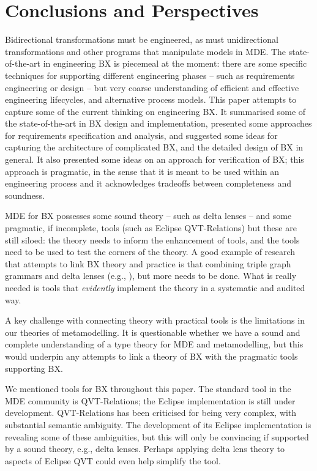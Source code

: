 \section{Conclusions and Perspectives}
\label{section:conclusions}

Bidirectional transformations must be engineered, as must unidirectional transformations and other programs that manipulate models in MDE. The state-of-the-art in engineering BX is piecemeal at the moment: there are some specific techniques for supporting different engineering phases -- such as requirements engineering or design -- but very coarse understanding of efficient and effective engineering lifecycles, and alternative process models. This paper attempts to capture some of the current thinking on engineering BX. It summarised some of the state-of-the-art in BX design and implementation, presented some approaches for requirements specification and analysis, and suggested some ideas for capturing the architecture of complicated BX, and the detailed design of BX in general. It also presented some ideas on an approach for verification of BX; this approach is pragmatic, in the sense that it is meant to be used within an engineering process and it acknowledges tradeoffs between completeness and soundness.

MDE for BX possesses some sound theory -- such as delta lenses -- and some pragmatic, if incomplete, tools (such as Eclipse QVT-Relations) but these are still siloed: the theory needs to inform the enhancement of tools, and the tools need to be used to test the corners of the theory. A good example of research that attempts to link BX theory and practice is that combining triple graph grammars and delta lenses (e.g., \cite{0001EOCDXGE15}), but more needs to be done. What is really needed is tools that \textit{evidently} implement the theory in a systematic and audited way.

A key challenge with connecting theory with practical tools is the limitations in our theories of metamodelling. It is questionable whether we have a sound and complete understanding of a type theory for MDE and metamodelling, but this would underpin any attempts to link a theory of BX with the pragmatic tools supporting BX.

We mentioned tools for BX throughout this paper. The standard tool in the MDE community is QVT-Relations; the Eclipse implementation is still under development. QVT-Relations has been criticised for being very complex, with substantial semantic ambiguity. The development of its Eclipse implementation is revealing some of these ambiguities, but this will only be convincing if supported by a sound theory, e.g., delta lenses. Perhaps applying delta lens theory to aspects of Eclipse QVT could even help simplify the tool.


